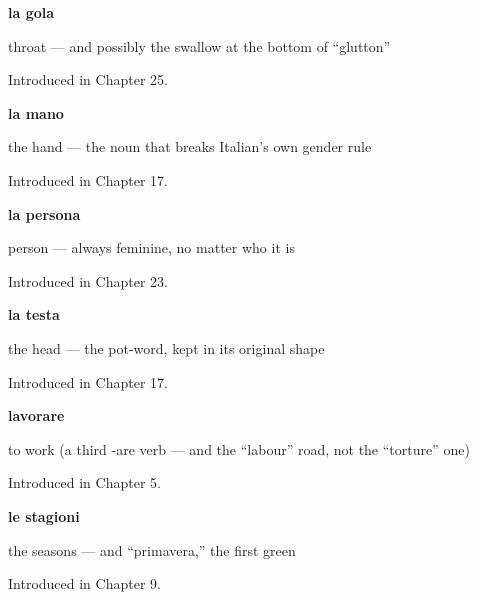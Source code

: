 \noindent\begin{minipage}[t]{\linewidth}
\raggedright
\textbf{la gola}\par
\small throat — and possibly the swallow at the bottom of \textquotedblleft{}glutton\textquotedblright{}\par
\footnotesize Introduced in Chapter 25.
\end{minipage}\par\medskip

\noindent\begin{minipage}[t]{\linewidth}
\raggedright
\textbf{la mano}\par
\small the hand — the noun that breaks Italian's own gender rule\par
\footnotesize Introduced in Chapter 17.
\end{minipage}\par\medskip

\noindent\begin{minipage}[t]{\linewidth}
\raggedright
\textbf{la persona}\par
\small person — always feminine, no matter who it is\par
\footnotesize Introduced in Chapter 23.
\end{minipage}\par\medskip

\noindent\begin{minipage}[t]{\linewidth}
\raggedright
\textbf{la testa}\par
\small the head — the pot-word, kept in its original shape\par
\footnotesize Introduced in Chapter 17.
\end{minipage}\par\medskip

\noindent\begin{minipage}[t]{\linewidth}
\raggedright
\textbf{lavorare}\par
\small to work (a third -are verb — and the \textquotedblleft{}labour\textquotedblright{} road, not the \textquotedblleft{}torture\textquotedblright{} one)\par
\footnotesize Introduced in Chapter 5.
\end{minipage}\par\medskip

\noindent\begin{minipage}[t]{\linewidth}
\raggedright
\textbf{le stagioni}\par
\small the seasons — and \textquotedblleft{}primavera,\textquotedblright{} the first green\par
\footnotesize Introduced in Chapter 9.
\end{minipage}\par\medskip

